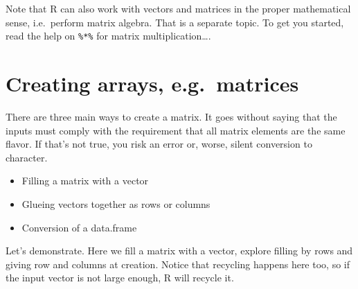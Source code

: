 \documentclass[
]{book}
\providecommand{\tightlist}{%
  \setlength{\itemsep}{0pt}\setlength{\parskip}{0pt}}
\begin{document}
Note that R can also work with vectors and matrices in the proper mathematical sense, i.e.~perform matrix algebra. That is a separate topic. To get you started, read the help on \texttt{\%*\%} for matrix multiplication\ldots.

\hypertarget{creating-arrays-e.g.-matrices}{%
\section{Creating arrays, e.g.~matrices}\label{creating-arrays-e.g.-matrices}}

There are three main ways to create a matrix. It goes without saying that the inputs must comply with the requirement that all matrix elements are the same flavor. If that's not true, you risk an error or, worse, silent conversion to character.

\begin{itemize}
\tightlist
\item
  Filling a matrix with a vector
\item
  Glueing vectors together as rows or columns
\item
  Conversion of a data.frame
\end{itemize}

Let's demonstrate. Here we fill a matrix with a vector, explore filling by rows and giving row and columns at creation. Notice that recycling happens here too, so if the input vector is not large enough, R will recycle it.
\end{document}
